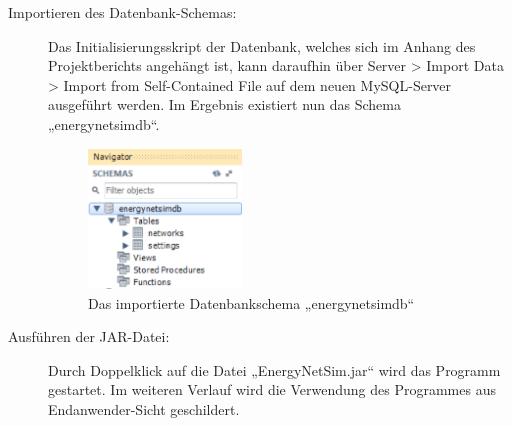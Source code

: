 \documentclass[12pt,titlepage]{article}
\begin{document}
\begin{description}
\begin{figure}[!ht]
	\label{fig:ErgSoftwareInst3}
\end{figure}
\item [Importieren des Datenbank-Schemas:] Das Initialisierungsskript der Datenbank, welches sich im Anhang des Projektberichts angehängt ist, kann daraufhin über Server > Import Data > Import from Self-Contained File auf dem neuen MySQL-Server ausgeführt werden. Im Ergebnis existiert nun das Schema „energynetsimdb“.
\begin{figure}[!ht]
	\centering
	\includegraphics[width=0.4\textwidth]{ErgSoftwareInst4}
	\caption{Das importierte Datenbankschema „energynetsimdb“}
	\label{fig:ErgSoftwareInst4}
\end{figure}
\item [Ausführen der JAR-Datei:] Durch Doppelklick auf die Datei „EnergyNetSim.jar“ wird das Programm gestartet. Im weiteren Verlauf wird die Verwendung des Programmes aus Endanwender-Sicht geschildert.
\end{description}
\end{document}
